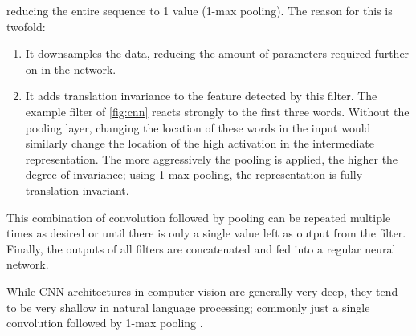 reducing the entire sequence to 1 value (1-max pooling). The reason for this is
twofold:
\begin{enumerate}
\item It downsamples the data, reducing the amount of parameters
  required further on in the network.
\item It adds translation invariance to the feature detected by this filter.
  The example filter of \cref{fig:cnn} reacts strongly to the first three
  words. Without the pooling layer, changing the location of these words in
  the input would similarly change the location of the high activation in the
  intermediate representation. The more aggressively
  the pooling is applied, the higher the degree of invariance; using 1-max
  pooling, the representation is fully translation invariant.
\end{enumerate}
This combination of convolution followed by pooling can be repeated multiple
times as desired or until there is only a single value left as output from the
filter. Finally, the outputs of all filters are concatenated and fed into a
regular neural network.

While CNN architectures in computer vision are generally very deep, they tend to
be very shallow in natural language processing; commonly just a single
convolution followed by 1-max pooling \citep{zhang2015conv}.

